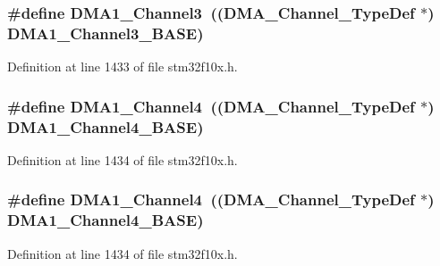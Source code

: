 \subsubsection[{\texorpdfstring{D\+M\+A1\+\_\+\+Channel3}{DMA1_Channel3}}]{\setlength{\rightskip}{0pt plus 5cm}\#define D\+M\+A1\+\_\+\+Channel3~(({\bf D\+M\+A\+\_\+\+Channel\+\_\+\+Type\+Def} $\ast$) {\bf D\+M\+A1\+\_\+\+Channel3\+\_\+\+B\+A\+SE})}\hypertarget{group___peripheral__declaration_gacf7b6093a37b306d7f1f50b2f200f0d0}{}\label{group___peripheral__declaration_gacf7b6093a37b306d7f1f50b2f200f0d0}


Definition at line 1433 of file stm32f10x.\+h.

\subsubsection[{\texorpdfstring{D\+M\+A1\+\_\+\+Channel4}{DMA1_Channel4}}]{\setlength{\rightskip}{0pt plus 5cm}\#define D\+M\+A1\+\_\+\+Channel4~(({\bf D\+M\+A\+\_\+\+Channel\+\_\+\+Type\+Def} $\ast$) {\bf D\+M\+A1\+\_\+\+Channel4\+\_\+\+B\+A\+SE})}\hypertarget{group___peripheral__declaration_gad2c42743316bf64da557130061b1f56a}{}\label{group___peripheral__declaration_gad2c42743316bf64da557130061b1f56a}


Definition at line 1434 of file stm32f10x.\+h.

\subsubsection[{\texorpdfstring{D\+M\+A1\+\_\+\+Channel4}{DMA1_Channel4}}]{\setlength{\rightskip}{0pt plus 5cm}\#define D\+M\+A1\+\_\+\+Channel4~(({\bf D\+M\+A\+\_\+\+Channel\+\_\+\+Type\+Def} $\ast$) {\bf D\+M\+A1\+\_\+\+Channel4\+\_\+\+B\+A\+SE})}\hypertarget{group___peripheral__declaration_gad2c42743316bf64da557130061b1f56a}{}\label{group___peripheral__declaration_gad2c42743316bf64da557130061b1f56a}


Definition at line 1434 of file stm32f10x.\+h.

